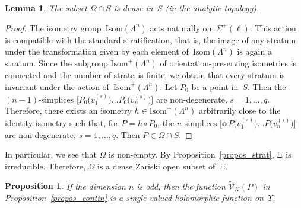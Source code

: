 \documentclass[reqno,tbtags,12pt]{amsart}
\numberwithin{equation}{section}
\newcommand{\tCV}{\widetilde{\mathcal{V}}}
\newcommand{\bo}{\mathbf{o}}
\newcommand{\bell}{\boldsymbol{\ell}}
\newtheorem{propos}[theorem]{Proposition}
\newtheorem{lem}[theorem]{Lemma}
\theoremstyle{definition}
\begin{document}
\begin{lem}\label{lem_nonzero}
The subset $\Omega\cap S$ is dense in~$S$ \textnormal{(}in the analytic topology\textnormal{)}.
\end{lem}

\begin{proof}
 The isometry group~$\mathrm{Isom}(\Lambda^n)$ acts naturally on~$\Sigma^+(\bell)$. This action is compatible with the standard stratification, that is, the image of any stratum under the transformation given by each element of~$\mathrm{Isom}(\Lambda^n)$ is again a stratum. Since the subgroup $\mathrm{Isom}^+(\Lambda^n)$  of orientation-preserving isometries is connected and the number of strata is finite, we obtain that every stratum is invariant under the action of~$\mathrm{Isom}^+(\Lambda^n)$. Let $ P_0$ be a point in~$S$. Then the $(n-1)$-simplices $\bigl[ P_0\bigl(v_1^{(s)}\bigr)\ldots P_0\bigl(v_n^{(s)}\bigr)\bigr]$ are non-degenerate, $s=1,\ldots,q$. Therefore, there exists an isometry $h\in\mathrm{Isom}^+(\Lambda^n)$ arbitrarily close to the identity isometry such that, for $ P=h\circ P_0$, the $n$-simplices $\bigl[\bo\, P\bigl(v_1^{(s)}\bigr)\ldots  P\bigl(v_n^{(s)}\bigr)\bigr]$ are non-degenerate, $s=1,\ldots,q$. Then $ P\in \Omega\cap S$.
\end{proof}

In particular, we see that $\Omega$ is non-empty. By Proposition~\ref{propos_strat}, $\Xi$ is irreducible. Therefore, $\Omega$ is a dense Zariski open subset of~$\Xi$. 


 
 \begin{propos}\label{propos_one_val}
If the dimension $n$ is odd, then the function $\tCV_K( P)$ in Proposition~\ref{propos_contin} is a single-valued holomorphic function on~$\Upsilon$.
\end{propos}
 
\end{document}
